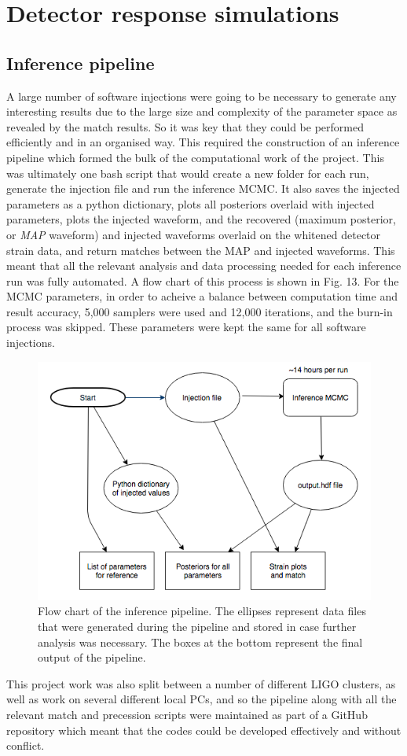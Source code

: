 \documentclass[11pt]{article}
\begin{document}
\section{Detector response simulations}
\subsection{Inference pipeline}
A large number of software injections were going to be necessary to generate any interesting results due to the large size and complexity of the parameter space as revealed by the match results. So it was key that they could be performed efficiently and in an organised way. This required the construction of an inference pipeline which formed the bulk of the computational work of the project. This was ultimately one bash script that would create a new folder for each run, generate the injection file and run the inference MCMC.  It also saves the injected parameters as a python dictionary, plots all posteriors overlaid with injected parameters, plots the injected waveform, and the recovered (maximum posterior, or \textit{MAP} waveform) and injected waveforms overlaid on the whitened detector strain data, and return matches between the MAP and injected waveforms. This meant that all the relevant analysis and data processing needed for each inference run was fully automated. A flow chart of this process is shown in Fig. 13. For the MCMC parameters, in order to acheive a balance between computation time and result accuracy, 5,000 samplers were used and 12,000 iterations, and the burn-in process was skipped. These parameters were kept the same for all software injections.
\begin{figure}[H]
	\includegraphics[scale=0.55]{fig13.png}
	\centering
	\caption{Flow chart of the inference pipeline. The ellipses represent data files that were generated during the pipeline and stored in case further analysis was necessary. The boxes at the bottom represent the final output of the pipeline.}
	\centering
\end{figure}
This project work was also split between a number of different LIGO clusters, as well as work on several different local PCs, and so the pipeline along with all the relevant match and precession scripts were maintained as part of a GitHub repository which meant that the codes could be developed effectively and without conflict.
\end{document}
